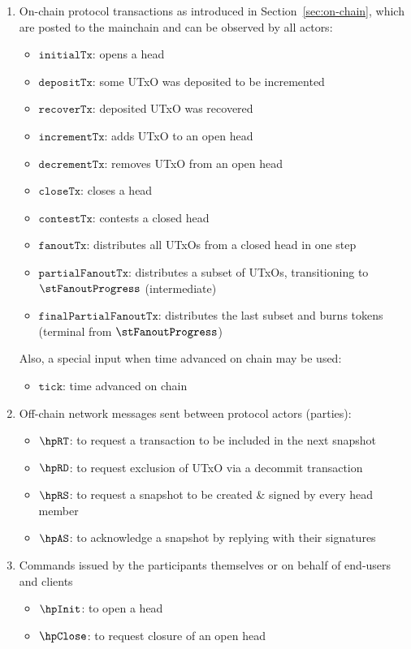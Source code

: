 \begin{enumerate}
	\item On-chain protocol transactions as introduced in
	      Section~\ref{sec:on-chain}, which are posted to the mainchain and can be
	      observed by all actors:
	      \begin{itemize}
		      \item $\mathtt{initialTx}$: opens a head
		      \item $\mathtt{depositTx}$: some UTxO was deposited to be incremented
		      \item $\mathtt{recoverTx}$: deposited UTxO was recovered
		      \item $\mathtt{incrementTx}$: adds UTxO to an open head
		      \item $\mathtt{decrementTx}$: removes UTxO from an open head
		      \item $\mathtt{closeTx}$: closes a head
		      \item $\mathtt{contestTx}$: contests a closed head
		      \item $\mathtt{fanoutTx}$: distributes all UTxOs from a closed head in one step
		      \item $\mathtt{partialFanoutTx}$: distributes a subset of UTxOs, transitioning to $\stFanoutProgress$ (intermediate)
		      \item $\mathtt{finalPartialFanoutTx}$: distributes the last subset and burns tokens (terminal from $\stFanoutProgress$)
	      \end{itemize}
	      Also, a special input when time advanced on chain may be used:
	      \begin{itemize}
		      \item $\mathtt{tick}$: time advanced on chain
	      \end{itemize}

	\item Off-chain network messages sent between protocol actors (parties):
	      \begin{itemize}
		      \item $\hpRT$: to request a transaction to be included in the next snapshot
		      \item $\hpRD$: to request exclusion of UTxO via a decommit transaction
		      \item $\hpRS$: to request a snapshot to be created \& signed by every head member
		      \item $\hpAS$: to acknowledge a snapshot by replying with their signatures
	      \end{itemize}
	\item Commands issued by the participants themselves or on behalf of end-users and clients
	      \begin{itemize}
		      \item $\hpInit$: to open a head
		      \item $\hpClose$: to request closure of an open head
	      \end{itemize}
\end{enumerate}

